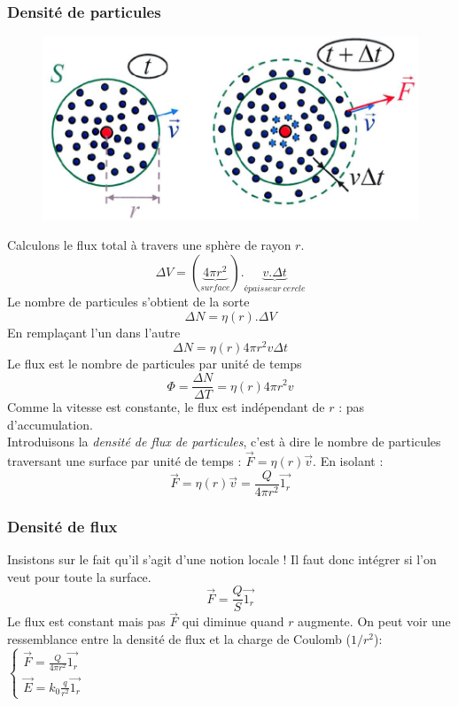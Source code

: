 \documentclass	[11pt, a4paper, openany]{book}
\begin{document}
\subsubsection{Densité de particules}
\begin{figure}
\includegraphics[scale=0.34]{es/image6.png}
\end{figure}
Calculons le flux total à travers une sphère de rayon $r$.
\begin{equation}
\Delta V = \left(\underbrace{4\pi r^2}_{surface}\right) . \underbrace{v.\Delta t}_{épaisseur\ cercle}
\end{equation}
Le nombre de particules s'obtient de la sorte
\begin{equation}
\Delta N = \eta(r).\Delta V
\end{equation}
En remplaçant l'un dans l'autre
\begin{equation}
\Delta N = \eta (r) 4\pi r^2 v\Delta t
\end{equation}
Le flux est le nombre de particules par unité de temps 
\begin{equation}
\Phi = \frac{\Delta N}{\Delta T} = \eta (r) 4\pi r^2 v
\end{equation}
Comme la vitesse est constante, le flux est indépendant de $r$ : pas d'accumulation.\\

Introduisons la \textit{densité de flux de particules}, c'est à dire le nombre de particules traversant une surface par unité de temps : $\vec{F} = \eta (r)\vec{v}$. En isolant :
\begin{equation}
\vec{F} = \eta (r)\vec{v} = \frac{Q}{4\pi r^2}\vec{1_r}
\end{equation}

\subsubsection{Densité de flux}
Insistons sur le fait qu'il s'agit d'une notion locale ! Il faut donc intégrer si l'on veut pour toute la surface.
\begin{equation}
\vec{F} = \frac{Q}{S}\vec{1_r}
\end{equation}
Le flux est constant mais pas $\vec{F}$ qui diminue quand $r$ augmente. On peut voir une ressemblance entre la densité de flux et la charge de Coulomb ($1/r^2$):
$\left\{\begin{array}{l}
\vec{F} = \frac{Q}{4\pi r^2}\vec{1_r}\\
\vec{E} = k_0 \frac{q}{r^2}\vec{1_r}
\end{array}\right.$
\end{document}
